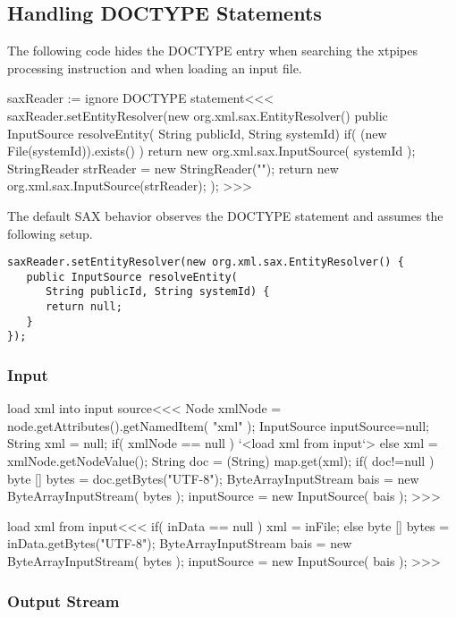 \documentclass{article}
\begin{document}
{%
\subsection{Handling DOCTYPE Statements}


The following code hides the DOCTYPE entry when searching the xtpipes
processing instruction and when loading an input file.

\<saxReader := ignore DOCTYPE statement\><<<
saxReader.setEntityResolver(new org.xml.sax.EntityResolver() {
   public InputSource resolveEntity(
                          String publicId, String systemId) {
     if( (new File(systemId)).exists() ){
        return new org.xml.sax.InputSource( systemId );
      }
      StringReader strReader = new StringReader("");
      return new org.xml.sax.InputSource(strReader);
   }
});
>>>

The default SAX behavior observes the DOCTYPE statement and assumes
the following setup.

\begin{verbatim}
saxReader.setEntityResolver(new org.xml.sax.EntityResolver() {
   public InputSource resolveEntity(
      String publicId, String systemId) {
      return null;
   }
});
\end{verbatim}




\subsubsection{Input}


\<load xml into input source\><<<
Node xmlNode = node.getAttributes().getNamedItem( "xml" );
InputSource inputSource=null;
String xml = null;
if( xmlNode == null ){
   `<load xml from input`>
} else {
   xml = xmlNode.getNodeValue();
   String doc = (String) map.get(xml);
   if( doc!=null ){
      byte [] bytes = doc.getBytes("UTF-8");
      ByteArrayInputStream bais = new ByteArrayInputStream( bytes );
      inputSource = new InputSource( bais );
}  }
>>>


\<load xml from input\><<<
if( inData == null ){
   xml = inFile;
} else {
   byte [] bytes = inData.getBytes("UTF-8");
   ByteArrayInputStream bais = new ByteArrayInputStream( bytes );
   inputSource = new InputSource( bais );
}
>>>


\subsubsection{Output Stream}


}
\end{document}
